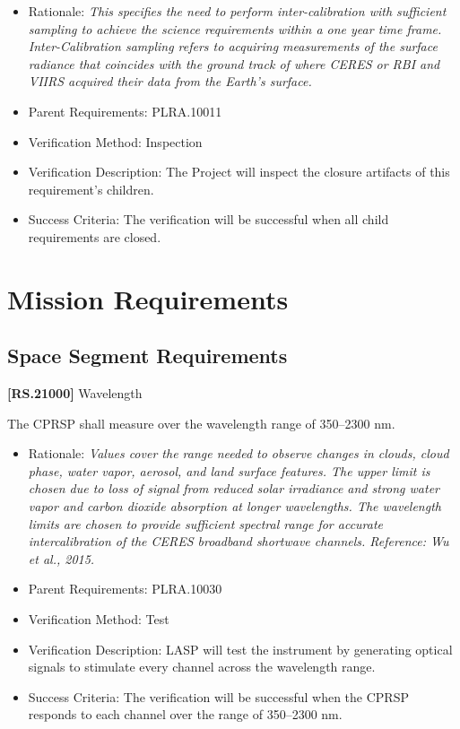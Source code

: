 \documentclass[12pt,oneside,oldfontcommands]{memoir}
\begin{document}
\begin{itemize}
\item{} Rationale: \emph{This specifies the need to perform inter-calibration with sufficient sampling to achieve the science requirements within a one year time frame. Inter-Calibration sampling refers to acquiring measurements of the surface radiance that coincides with the ground track of where CERES or RBI and VIIRS acquired their data from the Earth's surface.}

\item{} Parent Requirements: PLRA.10011

\item{} Verification Method: Inspection

\item{} Verification Description: The Project will inspect the closure artifacts of this requirement's children.

\item{} Success Criteria: The verification will be successful when all child requirements are closed.

\end{itemize}

\section{Mission Requirements}
\label{missionrequirements}

\subsection{Space Segment Requirements}
\label{spacesegmentrequirements}

\textbf{[RS.21000]} Wavelength

The \gls{CPRSP} shall \gls{measure} over the wavelength range of 350--2300 nm.

\begin{itemize}
\item{} Rationale: \emph{Values cover the range needed to observe changes in clouds, cloud phase, water vapor, aerosol, and land surface features. The upper limit is chosen due to loss of signal from reduced solar irradiance and strong water vapor and carbon dioxide absorption at longer wavelengths. The wavelength limits are chosen to provide sufficient spectral range for accurate intercalibration of the CERES broadband shortwave channels. Reference: Wu et al., 2015.}

\item{} Parent Requirements: PLRA.10030

\item{} Verification Method: Test

\item{} Verification Description: \gls{LASP} will \gls{test} the instrument by generating optical signals to stimulate every channel across the wavelength range.

\item{} Success Criteria: The verification will be successful when the \gls{CPRSP} responds to each channel over the range of 350--2300 nm.

\end{itemize}
\end{document}
